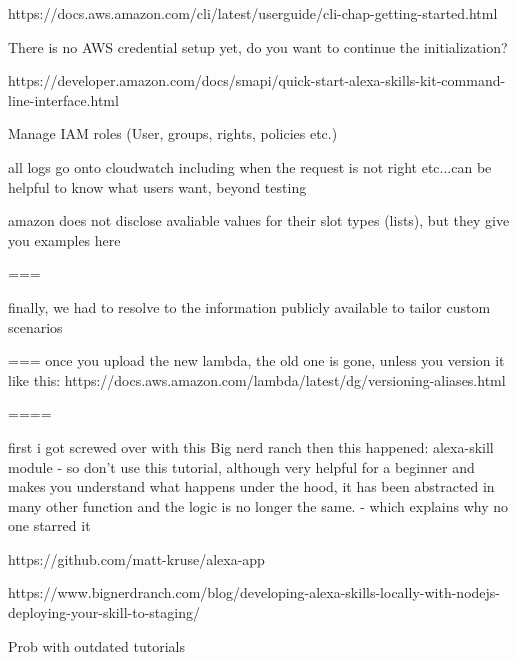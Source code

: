 https://docs.aws.amazon.com/cli/latest/userguide/cli-chap-getting-started.html

There is no AWS credential setup yet, do you want to continue the initialization?

https://developer.amazon.com/docs/smapi/quick-start-alexa-skills-kit-command-line-interface.html



Manage IAM roles (User, groups, rights, policies etc.)


all logs go onto cloudwatch
including when the request is not right etc...can be helpful to know what users want, beyond testing





amazon does not disclose avaliable values for their slot types (lists), but they give you examples here


===

finally, we had to resolve to the information publicly available to tailor custom scenarios



 ===
once you upload the new lambda, the old one is gone, unless you version it like this:
https://docs.aws.amazon.com/lambda/latest/dg/versioning-aliases.html



====

first i got screwed over with this Big nerd ranch then this happened: alexa-skill module
- so don't use this tutorial, although very helpful for a beginner and makes you understand what happens under the hood, it has been abstracted in many other function and the logic is no longer the same. - which explains why no one starred it

https://github.com/matt-kruse/alexa-app

https://www.bignerdranch.com/blog/developing-alexa-skills-locally-with-nodejs-deploying-your-skill-to-staging/




Prob with outdated tutorials